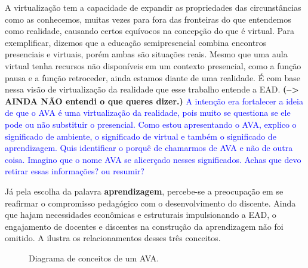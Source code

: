 A virtualização tem a capacidade de expandir as propriedades das circunstâncias como as conhecemos, muitas vezes para fora das fronteiras do que entendemos como realidade, causando certos equívocos na concepção do que é virtual. Para exemplificar, dizemos que a educação semipresencial combina encontros presenciais e virtuais, porém ambas são situações reais. Mesmo que uma aula virtual tenha recursos não disponíveis em um contexto presencial, como a função pausa e a função retroceder, ainda estamos diante de uma realidade. É com base nessa visão de virtualização da realidade que esse trabalho entende a EAD.
\textbf{(--> AINDA NÃO entendi o que queres dizer.)}  \textcolor{blue}{A intenção era fortalecer a ideia de que o AVA é uma virtualização da realidade, pois muito se questiona se ele pode ou não substituir o presencial. Como estou apresentando o AVA, explico o significado de ambiente, o significado de virtual e também o significado de aprendizagem. Quis identificar o porquê de chamarmos de AVA e não de outra coisa. Imagino que o nome AVA se alicerçado nesses significados. Achas que devo retirar essas informações? ou resumir?}

Já pela escolha da palavra \textbf{aprendizagem}, percebe-se a preocupação em se reafirmar o compromisso pedagógico com o desenvolvimento do discente. Ainda que hajam necessidades econômicas e estruturais impulsionando a EAD, o engajamento de docentes e discentes na construção da aprendizagem não foi omitido. A  ilustra os  relacionamentos desses três conceitos.
\begin{figure}[ht]
    \centering
    \caption{Diagrama de conceitos de um AVA.}
    \label{fig:ava}
\end{figure}  

